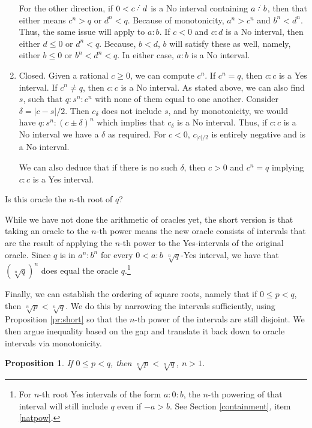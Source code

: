 \documentclass[12pt]{article}
\newtheorem{proposition}{Proposition}[subsection]
\begin{document}
\begin{enumerate}
    For the other direction, if $0 < c\lte d$ is a No interval containing $a \lte b$, then that either means $c^n > q$ or $d^n < q$. Because of monotonicity, $a^n >c^n$ and $b^n < d^n$. Thus, the same issue will apply to $a:b$. If $c < 0$ and $c:d$ is a No interval, then either $d \leq 0$ or $d^n < q$. Because, $b < d$, $b$ will satisfy these as well, namely, either $b \leq 0$ or $b^n < d^n < q$. In either case, $a:b$ is a No interval. 
    
    \item Closed. Given a rational $c \geq 0$, we can compute $c^n$. If $c^n = q$, then $c:c$ is a Yes interval. If $c^n \neq q$, then $c:c$ is a No interval. As stated above, we can also find $s$, such that $q:s^n:c^n$ with none of them equal to one another. Consider $\delta = |c-s|/2$. Then $c_\delta$ does not include $s$, and by monotonicity, we would have $q : s^n : (c\pm\delta)^n$ which implies that $c_\delta$ is a No interval. Thus, if $c:c$ is a No interval we have a $\delta$ as required. For $c<0$, $c_{|c|/2}$ is entirely negative and is a No interval. 

    We can also deduce that if there is no such $\delta$, then $c> 0$ and $c^n = q$ implying $c:c$ is a Yes interval.  
    
\end{enumerate}

Is this oracle the $n$-th root of $q$?

While we have not done the arithmetic of oracles yet, the short version is that taking an oracle to the $n$-th power means the new oracle consists of intervals that are the result of applying the $n$-th power to the Yes-intervals of the original oracle. Since $q$ is in $a^n:b^n$ for every $0<a:b$ $\sqrt[n]{q}$-Yes interval, we have that $(\sqrt[n]{q})^n$ does equal the oracle $q$.\footnote{For $n$-th root Yes \-intervals of the form $a:0:b$, the $n$-th powering of that interval will still include $q$ even if $-a>b$. See Section \ref{containment}, item \ref{natpow}.} 

Finally, we can establish the ordering of square roots, namely that if $0 \leq p<q$, then $\sqrt[n]{p} < \sqrt[n]{q}$. We do this by narrowing the intervals sufficiently, using Proposition \ref{pr:short} so that the $n$-th power of the intervals are still disjoint. We then argue inequality based on the gap and translate it back down to oracle intervals via monotonicity. 

\begin{proposition}
    If $0 \leq p <q$, then $\sqrt[n]{p} < \sqrt[n]{q}$, $n > 1$.
\end{proposition}
\end{document}
